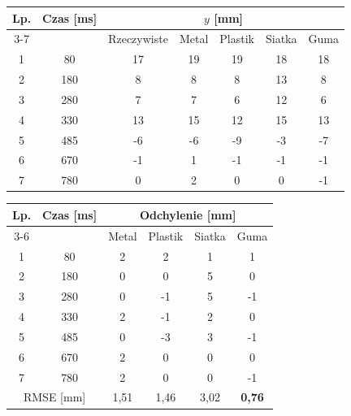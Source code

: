 \begin{tabular}{cc c cccc}
\toprule
Lp. & Czas [ms] & \multicolumn{5}{c}{$y$ [mm]} \\
\cmidrule(lr){3-7}
 &  & Rzeczywiste & Metal & Plastik & Siatka & Guma \\
\midrule
1 & 80 & 17 & 19 & 19 & 18 & 18 \\
2 & 180 & 8 & 8 & 8 & 13 & 8 \\
3 & 280 & 7 & 7 & 6 & 12 & 6 \\
4 & 330 & 13 & 15 & 12 & 15 & 13 \\
5 & 485 & -6 & -6 & -9 & -3 & -7 \\
6 & 670 & -1 & 1 & -1 & -1 & -1 \\
7 & 780 & 0 & 2 & 0 & 0 & -1 \\
\bottomrule
\end{tabular}

\bigskip

\begin{tabular}{cc cccc}
\toprule
Lp. & Czas [ms] & \multicolumn{4}{c}{Odchylenie [mm]} \\
\cmidrule(lr){3-6}
 &  & Metal & Plastik & Siatka & Guma \\
\midrule
1 & 80 & 2 & 2 & 1 & 1 \\
2 & 180 & 0 & 0 & 5 & 0 \\
3 & 280 & 0 & -1 & 5 & -1 \\
4 & 330 & 2 & -1 & 2 & 0 \\
5 & 485 & 0 & -3 & 3 & -1 \\
6 & 670 & 2 & 0 & 0 & 0 \\
7 & 780 & 2 & 0 & 0 & -1 \\
\midrule
\multicolumn{2}{c}{RMSE [mm]} & 1,51 & 1,46 & 3,02 & \textbf{0,76} \\
\bottomrule
\end{tabular}
